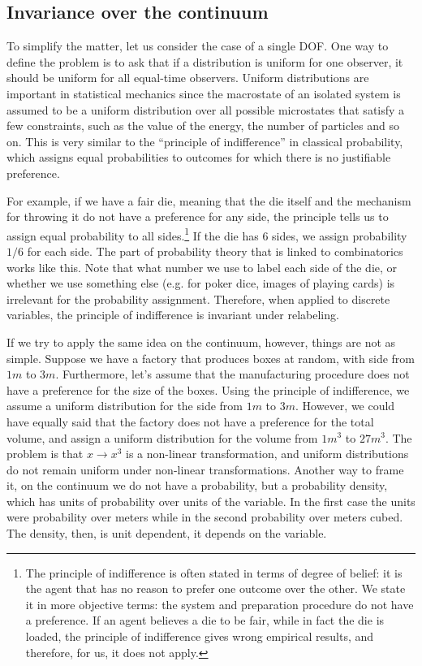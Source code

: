 \subsection{Invariance over the continuum}

To simplify the matter, let us consider the case of a single DOF. One way to define the problem is to ask that if a distribution is uniform for one observer, it should be uniform for all equal-time observers. Uniform distributions are important in statistical mechanics since the macrostate of an isolated system is assumed to be a uniform distribution over all possible microstates that satisfy a few constraints, such as the value of the energy, the number of particles and so on. This is very similar to the ``principle of indifference'' in classical probability, which assigns equal probabilities to outcomes for which there is no justifiable preference.

For example, if we have a fair die, meaning that the die itself and the mechanism for throwing it do not have a preference for any side, the principle tells us to assign equal probability to all sides.\footnote{The principle of indifference is often stated in terms of degree of belief: it is the agent that has no reason to prefer one outcome over the other. We state it in more objective terms: the system and preparation procedure do not have a preference. If an agent believes a die to be fair, while in fact the die is loaded, the principle of indifference gives wrong empirical results, and therefore, for us, it does not apply.} If the die has 6 sides, we assign probability $1/6$ for each side. The part of probability theory that is linked to combinatorics works like this. Note that what number we use to label each side of the die, or whether we use something else (e.g. for poker dice, images of playing cards) is irrelevant for the probability assignment. Therefore, when applied to discrete variables, the principle of indifference is invariant under relabeling.


If we try to apply the same idea on the continuum, however, things are not as simple. Suppose we have a factory that produces boxes at random, with side from $1m$ to $3m$. Furthermore, let's assume that the manufacturing procedure does not have a preference for the size of the boxes. Using the principle of indifference, we assume a uniform distribution for the side from $1m$ to $3m$. However, we could have equally said that the factory does not have a preference for the total volume, and assign a uniform distribution for the volume from $1m^3$ to $27 m^3$. The problem is that $x \to x^3$ is a non-linear transformation, and uniform distributions do not remain uniform under non-linear transformations. Another way to frame it, on the continuum we do not have a probability, but a probability density, which has units of probability over units of the variable. In the first case the units were probability over meters while in the second probability over meters cubed. The density, then, is unit dependent, it depends on the variable.

